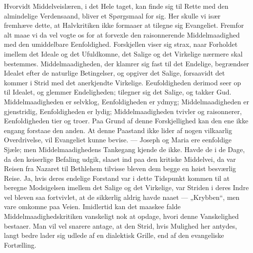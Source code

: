 \documentclass[12pt,a4paper]{book}
\begin{document}
Hvorvidt Middelveislæren, i det Hele taget, kan finde sig til Rette med den
almindelige Verdensaand, bliver et Spørgsmaal for sig. Her skulle vi især fremhæve
dette, at Halvkritiken ikke formaaer at tilegne sig Evangeliet. Fremfor alt maae vi
da vel vogte os for at forvexle den raisonnerende Middelmaadighed med den umiddelbare
Eenfoldighed. Forskjellen viser sig strax, naar Forholdet imellem det Ideale og det
Ufuldkomne, det Salige og det Virkelige nærmere skal bestemmes. Middelmaadigheden,
der klamrer sig fast til det Endelige, begrændser Idealet efter de naturlige
Betingelser, og opgiver det Salige, forsaavidt det kommer i Strid med det anerkjendte
Virkelige. Eeufoldigheden derimod seer op til Idealet, og glemmer Endeligheden;
tilegner sig det Salige, og takker Gud. Middelmaadigheden er selvklog, Eenfoldigheden
er ydmyg; Middelmaadigheden er gjenstridig, Eenfoldigheden er lydig;
Middelmaadigheden tvivler og raisonnerer, Eenfoldigheden tier og troer. Paa Grund af
denne Forskjellighed kan den ene ikke engang forstaae den anden. At denne Paastand
ikke lider af nogen vilkaarlig Overdrivelse, vil Evangeliet kunne bevise. --- Joseph
og Maria ere eenfoldige Sjæle; men Middelmaadighedens Tankegang kjende de ikke. Havde
de i de Dage, da den keiserlige Befaling udgik, slaaet ind paa den kritiske
Middelvei, da var Reisen fra Nazaret til Bethlehem tilvisse bleven dem begge en høist
besværlig Reise. Ja, hvis deres endelige Forstand
var i dette Tidspunkt kommen til at beregne Modsigelsen imellem det Salige og det
Virkelige, var Striden i deres Indre vel bleven saa fortvivlet, at de sikkerlig aldrig
havde naaet --- „Krybben“, men vare omkomne paa Veien. Imidlertid kan det maaskee
falde Middelmaadighedskritiken vanskeligt nok at opdage, hvori denne Vanskelighed
bestaaer. Man vil vel snarere antage, at den Strid, hvis Mulighed her antydes, langt
bedre lader sig udlede af en dialektisk Grille, end af den evangeliske Fortælling.
\end{document}
